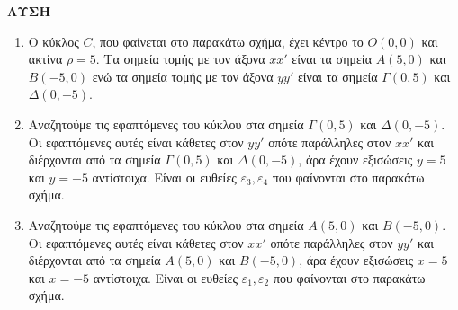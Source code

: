\textbf{ΛΥΣΗ}
\begin{enumerate}[α)]
    \item Ο κύκλος $C$, που φαίνεται στο παρακάτω σχήμα, έχει κέντρο το $O(0,0)$ και ακτίνα $\rho=5$. Τα σημεία τομής με τον άξονα $xx'$ είναι τα σημεία $A(5,0)$ και $B(-5,0)$ ενώ τα σημεία τομής με τον άξονα $yy'$ είναι τα σημεία $\Gamma(0,5)$ και $\Delta(0,-5)$.
    \item Αναζητούμε τις εφαπτόμενες του κύκλου στα σημεία $\Gamma(0,5)$ και $\Delta(0,-5)$. Οι εφαπτόμενες αυτές είναι κάθετες στον $yy'$ οπότε παράλληλες στον $xx'$ και διέρχονται από τα σημεία $\Gamma(0,5)$ και $\Delta(0,-5)$, άρα έχουν εξισώσεις $y=5$ και $y=-5$ αντίστοιχα. Είναι οι ευθείες $\varepsilon_3, \varepsilon_4$ που φαίνονται στο παρακάτω σχήμα.
    \item Αναζητούμε τις εφαπτόμενες του κύκλου στα σημεία $A(5,0)$ και $B(-5,0)$. Οι εφαπτόμενες αυτές είναι κάθετες στον $xx'$ οπότε παράλληλες στον $yy'$ και διέρχονται από τα σημεία $A(5,0)$ και $B(-5,0)$, άρα έχουν εξισώσεις $x=5$ και $x=-5$ αντίστοιχα. Είναι οι ευθείες $\varepsilon_1, \varepsilon_2$ που φαίνονται στο παρακάτω σχήμα.
\end{enumerate}
